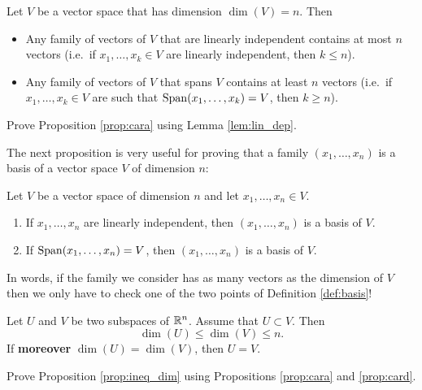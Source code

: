 \documentclass[11pt,nocut]{article}
\begin{document}
\begin{proposition}\label{prop:cara}
	Let $V$ be a vector space that has dimension $\dim(V) = n$. Then
	\begin{itemize}
		\item Any family of vectors of $V$ that are linearly independent contains at most $n$ vectors (i.e.\ if $x_1, \dots, x_k \in V$ are linearly independent, then $k \leq n$).
		\item Any family of vectors of $V$ that spans $V$ contains at least $n$ vectors (i.e.\ if $x_1, \dots, x_k \in V$ are such that ${{\rm Span}}(x_1, \dots, x_k) = V$, then $k \geq n$).
	\end{itemize}
\end{proposition}
\begin{exercise}
	Prove Proposition \ref{prop:cara} using Lemma \ref{lem:lin_dep}.
\end{exercise}

The next proposition is very useful for proving that a family $(x_1, \dots, x_n)$ is a basis of a vector space $V$ of dimension $n$:
\begin{proposition}\label{prop:card}
		Let $V$ be a vector space of dimension $n$ and let $x_1, \dots, x_n \in V$.
		\begin{enumerate}
			\item If $x_1, \dots, x_n$ are linearly independent, then $(x_1, \dots, x_n)$ is a basis of $V$.
			\item If ${{\rm Span}}(x_1, \dots, x_n) = V$, then $(x_1, \dots, x_n)$ is a basis of $V$.
		\end{enumerate}
	\end{proposition}

	In words, if the family we consider has as many vectors as the dimension of $V$ then we only have to check one of the two points of Definition \ref{def:basis}!

	\begin{proposition}\label{prop:ineq_dim}
	Let	$U$ and $V$ be two subspaces of $\mathbb{R}^n$. Assume that $U \subset V$. Then
	$$
	\dim(U) \leq \dim(V) \leq n.
	$$
	If \textbf{moreover} $\dim(U) = \dim(V)$, then $U = V$.
\end{proposition}
\begin{exercise}
	Prove Proposition \ref{prop:ineq_dim} using Propositions \ref{prop:cara} and \ref{prop:card}.
\end{exercise}
\end{document}
